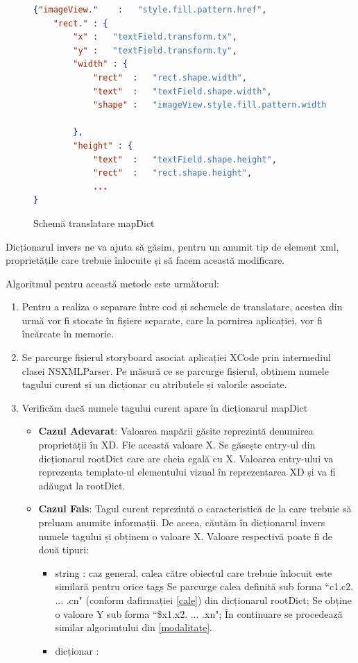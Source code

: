 \begin{figure}[!htbp]
\begin{lstlisting}[language=json,firstnumber=1]
{"imageView."    :   "style.fill.pattern.href",
    "rect." : {
        "x" :   "textField.transform.tx",
        "y" :   "textField.transform.ty",
        "width" : {
            "rect"  :   "rect.shape.width",
            "text"  :   "textField.shape.width",
            "shape" :   "imageView.style.fill.pattern.width"
        
        },
        "height" : {
            "text"  :   "textField.shape.height",
            "rect"  :   "rect.shape.height",
            ...
}
\end{lstlisting}
\caption{Schemă translatare mapDict} \label{fig:MapDict Schema}
\end{figure}


Dicționarul invers ne va ajuta să găsim, pentru un anumit tip de element xml, proprietățile care trebuie înlocuite și să facem această modificare. 

Algoritmul pentru această metode este următorul:

\begin{enumerate}
\item Pentru a realiza o separare între cod și schemele de translatare, acestea din urmă vor fi stocate în fișiere separate, care la pornirea aplicației, vor fi încărcate în memorie.
\item Se parcurge fișierul storyboard asociat aplicației XCode prin intermediul clasei NSXMLParser. Pe măsură ce se parcurge fișierul, obținem numele tagului curent și un dicționar cu atributele și valorile asociate.
\item Verificăm dacă numele tagului curent apare în dicționarul mapDict
\begin{itemize}
\item \textbf{Cazul Adevarat}: Valoarea mapării găsite reprezintă denumirea proprietății în XD. Fie această valoare X. Se găsește entry-ul din dicționarul rootDict care are cheia egală cu X. Valoarea entry-ului va reprezenta template-ul elementului vizual în reprezentarea XD și va fi adăugat la rootDict.
\item \textbf{Cazul Fals}: Tagul curent reprezintă o caracteristică de la care trebuie să preluam anumite informații. De aceea, căutăm în dicționarul invers numele tagului și obținem o valoare X. Valoare respectivă poate fi de două tipuri:
\begin{itemize}
\item string : caz general, calea către obiectul care trebuie înlocuit este similară pentru orice tagș Se parcurge calea definită sub forma ``c1.c2. ... .cn" (conform dafirmației \ref{cale}) din dicționarul rootDict; Se obține o valoare Y sub forma ``\$x1.x2. ... .xn"; În continuare se procedează similar algorimtului din \ref{modalitate}.
\item dicționar :
\end{itemize}
\end{itemize}
\end{enumerate}


